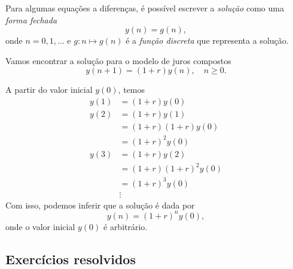 Para algumas equações a diferenças, é possível escrever a \emph{solução} como uma \emph{forma fechada}
\begin{equation}
  y(n) = g(n),
\end{equation}
onde $n = 0, 1, \ldots$ e $g:n\mapsto g(n)$ é a \emph{função discreta} que representa a solução.

\begin{ex}
  Vamos encontrar a solução para o modelo de juros compostos
  \begin{equation}
    y(n+1) = (1+r)y(n),\quad n\geq 0.
  \end{equation}

  A partir do valor inicial $y(0)$, temos
  \begin{align}
    y(1) &= (1+r)y(0)\\
    y(2) &= (1+r)y(1)\\
        &= (1+r)(1+r)y(0)\\
        &= (1+r)^2y(0) \\
    y(3) &= (1+r)y(2)\\
        &= (1+r)(1+r)^2y(0)\\
        &= (1+r)^3y(0)\\
        &\vdots
  \end{align}
  Com isso, podemos inferir que a solução é dada por
  \begin{equation}
    y(n) = (1+r)^ny(0),
  \end{equation}
  onde o valor inicial $y(0)$ é arbitrário.
\end{ex}

\subsection*{Exercícios resolvidos}

